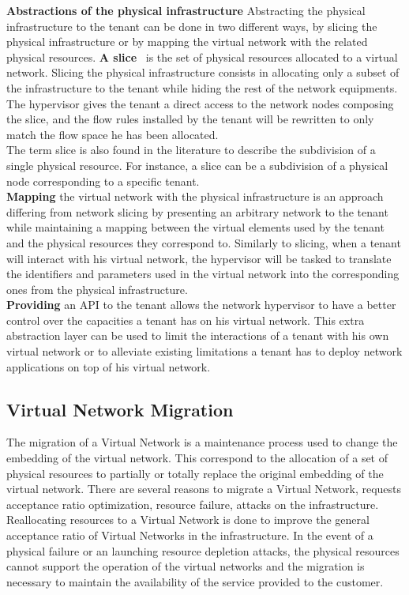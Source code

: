 \textbf{Abstractions of the physical infrastructure}
Abstracting the physical infrastructure to the tenant can be done in two different ways, by slicing the physical infrastructure or by mapping the virtual network with the related physical resources.
\textbf{A slice}~\cite{FlowVisor-Sherwood2009} is the set of physical resources allocated to a virtual network.
Slicing the physical infrastructure consists in allocating only a subset of the infrastructure to the tenant while hiding the rest of the network equipments.
The hypervisor gives the tenant a direct access to the network nodes composing the slice, and the flow rules installed by the tenant will be rewritten to only match the flow space he has been allocated.\\
The term slice is also found in the literature to describe the subdivision of a single physical resource. For instance, a slice can be a subdivision of a physical node corresponding to a specific tenant.\\
\textbf{Mapping} the virtual network with the physical infrastructure is an approach differing from network slicing by presenting an arbitrary network to the tenant while maintaining a mapping between the virtual elements used by the tenant and the physical resources they correspond to.
Similarly to slicing, when a tenant will interact with his virtual network, the hypervisor will be tasked to translate the identifiers and parameters used in the virtual network into the corresponding ones from the physical infrastructure.\\
\textbf{Providing} an API to the tenant allows the network hypervisor to have a better control over the capacities a tenant has on his virtual network. This extra abstraction layer can be used to limit the interactions of a tenant with his own virtual network or to alleviate existing limitations a tenant has to deploy network applications on top of his virtual network. 



\subsection{Virtual Network Migration}
The migration of a Virtual Network is a maintenance process used to change the embedding of the virtual network. 
This correspond to the allocation of a set of physical resources to partially or totally replace the original embedding of the virtual network.
There are several reasons to migrate a Virtual Network, requests acceptance ratio optimization, resource failure, attacks on the infrastructure.
Reallocating resources to a Virtual Network is done to improve the general acceptance ratio of Virtual Networks in the infrastructure.
In the event of a physical failure or an launching resource depletion attacks, the physical resources cannot support the operation of the virtual networks and the migration is necessary to maintain the availability of the service provided to the customer.

